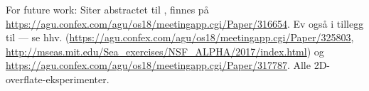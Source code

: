 \begin{framed}
    For future work: Siter abstractet til \parencite{haller2018material},
    finnes på
    \url{https://agu.confex.com/agu/os18/meetingapp.cgi/Paper/316654}.
    Ev også \parencite{filippi2018detection} i tillegg til
    \parencite{peacock2018targeted} --- se hhv. (\url{https://agu.confex.com/agu/os18/meetingapp.cgi/Paper/325803},
    \url{http://mseas.mit.edu/Sea_exercises/NSF_ALPHA/2017/index.html}) og \url{https://agu.confex.com/agu/os18/meetingapp.cgi/Paper/317787}.
    Alle 2D-overflate-eksperimenter.
\end{framed}
